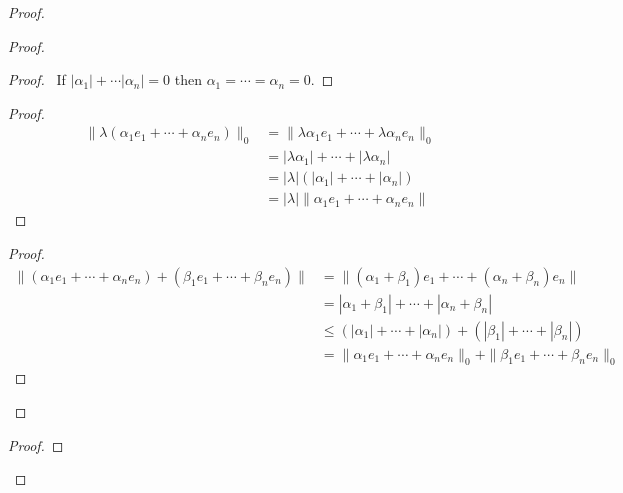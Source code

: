 \documentclass{book}
\theoremstyle{definition}
\begin{document}
\begin{proof}
\pf
{}
\begin{proof}
	\begin{proof}
		\pf\ If $|\alpha_1| + \cdots | \alpha_n| = 0$ then $\alpha_1 = \cdots = \alpha_n = 0$.
	\end{proof}
	\begin{proof}
		\pf
		\begin{align*}
			\| \lambda (\alpha_1 e_1 + \cdots + \alpha_n e_n) \|_0 & = \| \lambda \alpha_1 e_1 + \cdots + \lambda \alpha_n e_n \|_0 \\
			& = |\lambda \alpha_1| + \cdots + |\lambda \alpha_n| \\
			& = |\lambda| (|\alpha_1| + \cdots + |\alpha_n|) \\
			& = |\lambda| \| \alpha_1 e_1 + \cdots + \alpha_n e_n \|
		\end{align*}
	\end{proof}
	\begin{proof}
		\pf
		\begin{align*}
			\| (\alpha_1 e_1 + \cdots + \alpha_n e_n) + (\beta_1 e_1 + \cdots + \beta_n e_n) \|
			& = \| (\alpha_1 + \beta_1) e_1 + \cdots + (\alpha_n + \beta_n) e_n \| \\
			& = |\alpha_1 + \beta_1| + \cdots + |\alpha_n + \beta_n| \\
			& \leq (|\alpha_1| + \cdots + |\alpha_n|) + (|\beta_1| + \cdots + |\beta_n|) \\
			& = \| \alpha_1 e_1 + \cdots + \alpha_n e_n\|_0 + \| \beta_1 e_1 + \cdots + \beta_n e_n \|_0
		\end{align*}
	\end{proof}
\end{proof}
\begin{proof}

\end{proof}
\end{proof}
\end{document}
